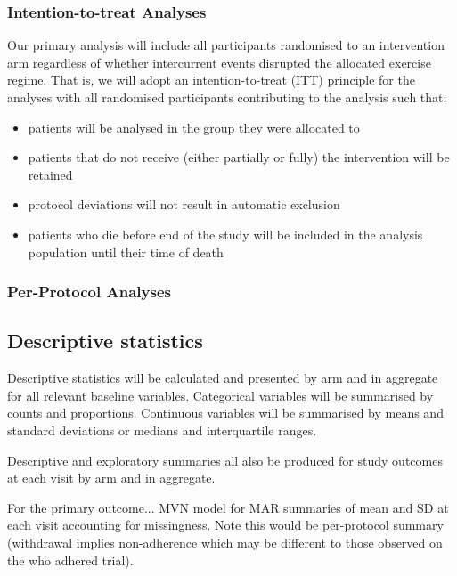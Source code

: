 \documentclass[
]{article}
\providecommand{\tightlist}{%
  \setlength{\itemsep}{0pt}\setlength{\parskip}{0pt}}
\begin{document}
\subsubsection{Intention-to-treat Analyses}

Our primary analysis will include all participants randomised to an intervention arm regardless of whether intercurrent events disrupted the allocated exercise regime.
That is, we will adopt an intention-to-treat (ITT) principle for the analyses with all randomised participants contributing to the analysis such that:

\begin{itemize}
  \tightlist
  \item patients will be analysed in the group they were allocated to
  \item patients that do not receive (either partially or fully) the intervention will be retained
  \item protocol deviations will not result in automatic exclusion
  \item patients who die before end of the study  will be included in the analysis population until their time of death
\end{itemize}

\subsubsection{Per-Protocol Analyses}



\hypertarget{descriptive-statistics}{%
  \subsection{Descriptive statistics}\label{descriptive-statistics}}

Descriptive statistics will be calculated and presented by arm and in aggregate for all relevant baseline variables.
Categorical variables will be summarised by counts and proportions.
Continuous variables will be summarised by means and standard deviations or medians and interquartile ranges.

Descriptive and exploratory summaries all also be produced for study outcomes at each visit by arm and in aggregate.

For the primary outcome... MVN model for MAR summaries of mean and SD at each visit accounting for missingness.
Note this would be per-protocol summary (withdrawal implies non-adherence which may be different to those observed on the who adhered trial).
\end{document}
